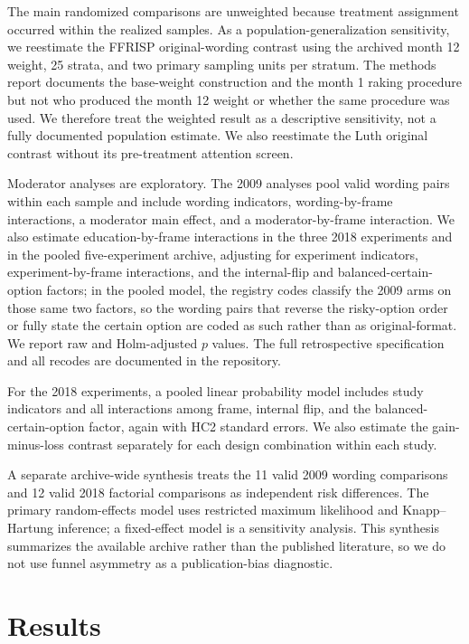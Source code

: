 \documentclass[11pt]{article}
\begin{document}
The main randomized comparisons are unweighted because treatment assignment occurred within the realized samples. As a population-generalization sensitivity, we reestimate the FFRISP original-wording contrast using the archived month 12 weight, 25 strata, and two primary sampling units per stratum. The methods report documents the base-weight construction and the month 1 raking procedure but not who produced the month 12 weight or whether the same procedure was used. We therefore treat the weighted result as a descriptive sensitivity, not a fully documented population estimate. We also reestimate the Luth original contrast without its pre-treatment attention screen.

Moderator analyses are exploratory. The 2009 analyses pool valid wording pairs within each sample and include wording indicators, wording-by-frame interactions, a moderator main effect, and a moderator-by-frame interaction. We also estimate education-by-frame interactions in the three 2018 experiments and in the pooled five-experiment archive, adjusting for experiment indicators, experiment-by-frame interactions, and the internal-flip and balanced-certain-option factors; in the pooled model, the registry codes classify the 2009 arms on those same two factors, so the wording pairs that reverse the risky-option order or fully state the certain option are coded as such rather than as original-format. We report raw and Holm-adjusted $p$ values. The full retrospective specification and all recodes are documented in the repository.

For the 2018 experiments, a pooled linear probability model includes study indicators and all interactions among frame, internal flip, and the balanced-certain-option factor, again with HC2 standard errors. We also estimate the gain-minus-loss contrast separately for each design combination within each study.

A separate archive-wide synthesis treats the 11 valid 2009 wording comparisons and 12 valid 2018 factorial comparisons as independent risk differences. The primary random-effects model uses restricted maximum likelihood and Knapp--Hartung inference; a fixed-effect model is a sensitivity analysis. This synthesis summarizes the available archive rather than the published literature, so we do not use funnel asymmetry as a publication-bias diagnostic.

\section{Results}
\end{document}
